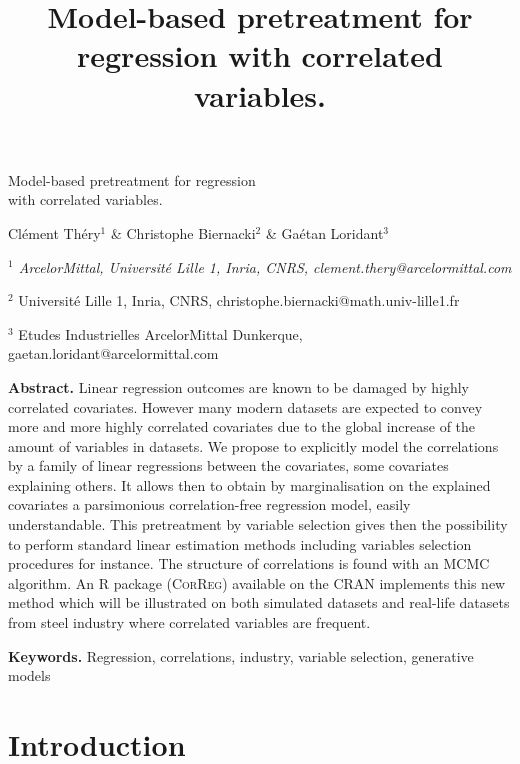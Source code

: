 \documentclass[11pt,a4paper]{article}
\title{Model-based pretreatment for regression with correlated variables.}
\begin{document}
\begin{center}
{\Large
	{\sc Model-based pretreatment for regression \\ with correlated variables.}
}
\bigskip

  Clément Théry$^{1}$ \& Christophe Biernacki$^{2}$ \& Gaétan Loridant$^{3}$
\bigskip

{\it
$^{1}$ ArcelorMittal, Université Lille 1, Inria, CNRS, clement.thery@arcelormittal.com
 
$^{2}$ Université Lille 1, Inria, CNRS, christophe.biernacki@math.univ-lille1.fr

$^{3}$ Etudes Industrielles ArcelorMittal Dunkerque, gaetan.loridant@arcelormittal.com\textbf{}
}
\end{center}
\bigskip

{\bf Abstract.} Linear regression outcomes are known to be damaged by highly correlated covariates. However many modern datasets are expected to convey more and more highly correlated covariates due to the global increase of the amount of variables in datasets. We propose to explicitly model the correlations by a family of linear regressions between the covariates, some covariates explaining others. It allows then to obtain by marginalisation on the explained covariates a parsimonious correlation-free regression model, easily understandable. This pretreatment by variable selection gives then the possibility to perform standard linear estimation methods including variables selection procedures for instance. The structure of correlations is found with an MCMC algorithm. An R package (\textsc{CorReg}) available on the CRAN implements this new method which will be illustrated on both simulated datasets and real-life datasets from steel industry where correlated variables are frequent.
\smallskip

{\bf Keywords.} Regression, correlations, industry, variable selection, generative models

\section{Introduction}
\end{document}
